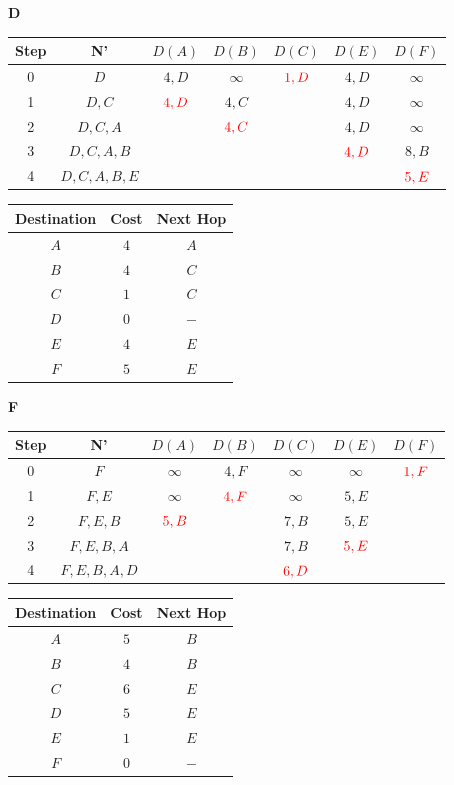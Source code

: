 \documentclass[10pt]{article}
\begin{document}
	\begin{center}
	 	\textbf{D}
 		\begin{tabular}{||c c c c c c c||} 
 			\hline
 			Step & N' & $D(A)$ & $D(B)$ & $D(C)$ & $D(E)$ & $D(F)$ \\[0.5ex] 
 			\hline\hline
 			0 & $D$ & $4,D$ & $\infty$ & $\color{red} 1,D$ & $4,D$ & $\infty$ \\
 			\hline
 			1 & $D,C$ & $\color{red} 4,D$ & $4,C$ & & $4,D$ & $\infty$ \\
 			\hline
 			2 & $D,C,A$ & & $\color{red} 4,C$ & & $4,D$ & $\infty$ \\
 			\hline
 			3 & $D,C,A,B$ & & & & $\color{red} 4,D$ & $8,B$ \\
 			\hline
 			4 & $D,C,A,B,E$ & & & & & $\color{red} 5,E$ \\[0.5ex]  
 			\hline
		\end{tabular}
		\quad
		\begin{tabular}{||c || c || c||}
			\hline
 			Destination & Cost & Next Hop\\[0.5ex] 
 			\hline\hline
			$A$ & $4$ & $A$\\
			$B$ & $4$ & $C$\\
 			$C$ & $1$ & $C$\\
			$D$ & $0$ & $-$\\
			$E$ & $4$ & $E$\\
			$F$ & $5$ & $E$\\[0.5ex]
			\hline
		\end{tabular}
	\end{center}
	
	\begin{center}
	 	\textbf{F}
 		\begin{tabular}{||c c c c c c c||} 
 			\hline
 			Step & N' & $D(A)$ & $D(B)$ & $D(C)$ & $D(E)$ & $D(F)$ \\[0.5ex] 
 			\hline\hline
 			0 & $F$ & $\infty$ & $4,F$ & $\infty$ & $\infty$ & $\color{red} 1,F$ \\
 			\hline
 			1 & $F,E$ & $\infty$ & $\color{red} 4,F$ & $\infty$ & $5,E$  & \\
 			\hline
 			2 & $F,E,B$ & $\color{red} 5,B$ & & $7,B$ & $5,E$ & \\
 			\hline
 			3 & $F,E,B,A$ & & & $7,B$ & $\color{red} 5,E$ & \\
 			\hline
 			4 & $F,E,B,A,D$ & & & $\color{red} 6,D$ & &\\[0.5ex]  
 			\hline
		\end{tabular}
		\quad
		\begin{tabular}{||c || c || c||}
			\hline
 			Destination & Cost & Next Hop\\[0.5ex] 
 			\hline\hline
			$A$ & $5$ & $B$\\
			$B$ & $4$ & $B$\\
 			$C$ & $6$ & $E$\\
			$D$ & $5$ & $E$\\
			$E$ & $1$ & $E$\\
			$F$ & $0$ & $-$\\[0.5ex]
			\hline
		\end{tabular}
	\end{center}
	
\end{document}
